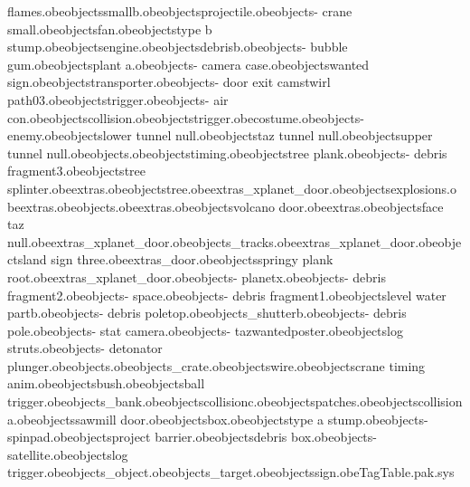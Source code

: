 flames.obe objects\digger smallb.obe objects\jet projectile.obe objects\bank - crane small.obe objects\jet fan.obe objects\tree type b stump.obe objects\jet engine.obe objects\spiky debrisb.obe objects\bank - bubble gum.obe objects\tasmania plant a.obe objects\bank - camera case.obe objects\runway wanted sign.obe objects\lift transporter.obe objects\bank -  door exit camstwirl path03.obe objects\lift trigger.obe objects\bank - air con.obe objects\egg collision.obe objects\whackabox trigger.obe costume\elephant.obe objects\bank - enemy.obe objects\spark lower tunnel null.obe objects\spark taz tunnel null.obe objects\spark upper tunnel null.obe objects\eggbird.obe objects\spark timing.obe objects\destructible tree plank.obe objects\bank - debris fragment3.obe objects\white tree splinter.obe extras\anvil.obe objects\hollow tree.obe extras\city_xplanet_door.obe objects\shortcut explosions.obe extras\drumstickfull.obe objects\trolley.obe extras\littlepiano.obe objects\left volcano door.obe extras\piano.obe objects\rock face taz null.obe extras\tazmania_xplanet_door.obe objects\crane_tracks.obe extras\west_xplanet_door.obe objects\taz land sign three.obe extras\xplanet_door.obe objects\tree springy plank root.obe extras\zoo_xplanet_door.obe objects\bank - planetx.obe objects\bank - debris fragment2.obe objects\bank - space.obe objects\bank - debris fragment1.obe objects\lower level water partb.obe objects\bank - debris poletop.obe objects\bank_shutterb.obe objects\bank - debris pole.obe objects\bank - stat camera.obe objects\bank - tazwantedposter.obe objects\hanging log struts.obe objects\bank - detonator plunger.obe objects\cage.obe objects\tnt_crate.obe objects\crane wire.obe objects\taz crane timing anim.obe objects\spicky bush.obe objects\recking ball trigger.obe objects\musicbox_bank.obe objects\digger collisionc.obe objects\flower patches.obe objects\digger collisiona.obe objects\left sawmill door.obe objects\music box.obe objects\tree type a stump.obe objects\bank - spinpad.obe objects\sawmill project barrier.obe objects\wobble debris box.obe objects\bank - satellite.obe objects\rotating log trigger.obe objects\bouncy_object.obe objects\transport_target.obe objects\construction sign.obe TagTable.pak.sys 